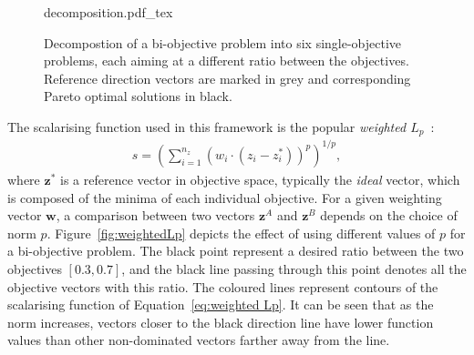 \documentclass[a4paper]{article}
\newcommand{\brs}[1]{\left[{#1}\right]} %
\newcommand{\brr}[1]{{\left({#1}\right)}} %
\newcommand{\vz}{\ensuremath{\mathbf{z}}} %
\newcommand{\vw}{\ensuremath{\mathbf{w}}} %
\begin{document}
\begin{figure}
	\centering
	\def\svgwidth{0.4\textwidth}
	{decomposition.pdf_tex}
	\caption{Decompostion of a bi-objective problem into six single-objective problems, each aiming at a different ratio between the objectives.
	Reference direction vectors are marked in grey and corresponding Pareto optimal solutions in black.}
	\label{fig:decomposition}
\end{figure}

The scalarising function used in this framework is the popular \emph{weighted $L_p$}~\cite{koski1987norm,Marler2004Survey}:
\begin{align}
\label{eq:weighted Lp}
	s = \brr{\sum_{i=1}^{n_z} \brr{w_i\cdot \brr{z_i-z_i^*}}^p}^{1/p},
\end{align}
where $\mathbf{z^*}$ is a reference vector in objective space, typically the \emph{ideal} vector, which is composed of the minima of each individual objective. For a given weighting vector $\vw$, a comparison between two vectors $\vz^{A}$ and $\vz^{B}$ depends on the choice of norm $p$. Figure~\ref{fig:weightedLp} depicts the effect of using different values of $p$ for a bi-objective problem. The black point represent a desired ratio between the two objectives $\brs{0.3,0.7}$, and the black line passing through this point denotes all the objective vectors with this ratio. The coloured lines represent contours of the scalarising function of Equation~\eqref{eq:weighted Lp}. It can be seen that as the norm increases, vectors closer to the black direction line have lower function values than other non-dominated vectors farther away from the line.
\end{document}
